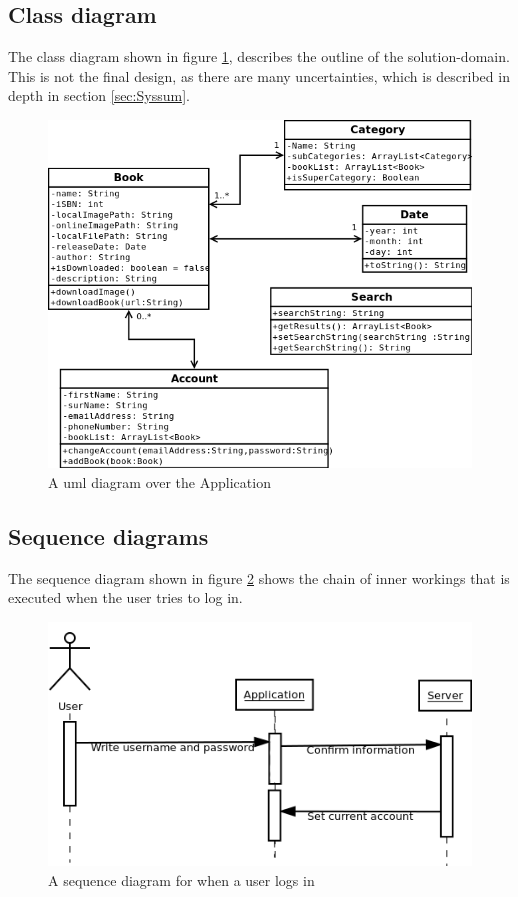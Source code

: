 \message{ !name(Rapport.tex)}\documentclass[12pt]{article}
\begin{document}
\subsection{Class diagram}
The class diagram shown in figure \ref{uml}, describes the outline of the solution-domain. This is not the final design, as there are many uncertainties, which is described in depth in section \ref{sec:Syssum}.
\begin{figure}[H]
\includegraphics[scale=0.6]{uml.png}
\caption{A uml diagram over the Application}
\label{uml}
\end{figure}
\subsection{Sequence diagrams}

The sequence diagram shown in figure \ref{SeqDiaLogin} shows the chain of inner workings that is executed when the user tries to log in.
\begin{figure}[H]
\includegraphics[scale=0.6]{SequenceDiagramLogin.png}
\caption{A sequence diagram for when a user logs in}
\label{SeqDiaLogin}
\end{figure}
\end{document}
